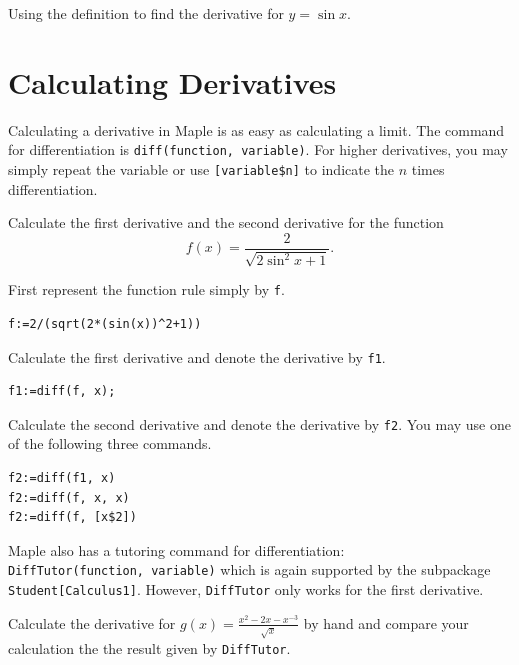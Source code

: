 \documentclass[]{book}
\theoremstyle{definition}
\theoremstyle{definition}
\theoremstyle{definition}
\theoremstyle{remark}
\let\BeginKnitrBlock\begin \let\EndKnitrBlock\end
\begin{document}
\BeginKnitrBlock{exercise}
\protect\hypertarget{exr:unnamed-chunk-5}{}{\label{exr:unnamed-chunk-5} }
Using the definition to find the derivative for \(y=\sin x\).
\EndKnitrBlock{exercise}

\hypertarget{calculating-derivatives}{%
\section{Calculating Derivatives}\label{calculating-derivatives}}

Calculating a derivative in Maple is as easy as calculating a limit. The command for differentiation is \texttt{diff(function,\ variable)}. For higher derivatives, you may simply repeat the variable or use \texttt{{[}variable\$n{]}} to indicate the \(n\) times differentiation.

\BeginKnitrBlock{example}
\protect\hypertarget{exm:unnamed-chunk-6}{}{\label{exm:unnamed-chunk-6} }
Calculate the first derivative and the second derivative for the function
\[
f(x)=\frac{2}{\sqrt{2\sin^2 x + 1}}.
\]
\EndKnitrBlock{example}

\BeginKnitrBlock{solution}
{}
First represent the function rule simply by \texttt{f}.

\begin{verbatim}
f:=2/(sqrt(2*(sin(x))^2+1))
\end{verbatim}

Calculate the first derivative and denote the derivative by \texttt{f1}.

\begin{verbatim}
f1:=diff(f, x);
\end{verbatim}

Calculate the second derivative and denote the derivative by \texttt{f2}. You may use one of the following three commands.

\begin{verbatim}
f2:=diff(f1, x)
f2:=diff(f, x, x)
f2:=diff(f, [x$2])
\end{verbatim}
\EndKnitrBlock{solution}

Maple also has a tutoring command for differentiation: \texttt{DiffTutor(function,\ variable)} which is again supported by the subpackage \texttt{Student{[}Calculus1{]}}. However, \texttt{DiffTutor} only works for the first derivative.

\BeginKnitrBlock{example}
\protect\hypertarget{exm:unnamed-chunk-8}{}{\label{exm:unnamed-chunk-8} }
Calculate the derivative for \(g(x)=\frac{x^2-2x-x^{-3}}{\sqrt{x}}\) by hand and compare your calculation the the result given by \texttt{DiffTutor}.
\EndKnitrBlock{example}
\end{document}
